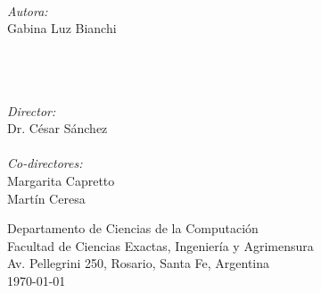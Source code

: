 {\begin{center}
    \HRule \\[0.4cm] %
    \noindent
    \begin{minipage}{0.4\textwidth}
        \begin{flushleft} \large
            \emph{Autora:}\\
            Gabina Luz Bianchi \\\ \\\ \\\ \\
        \end{flushleft}
        \end{minipage}%
        \begin{minipage}{0.4\textwidth}
        \begin{flushright} \large
            \emph{Director:} \\
            Dr. César Sánchez\\
            \ \\
            \emph{Co-directores:} \\
            Margarita Capretto\\
            Martín Ceresa\\
        \end{flushright}
    \end{minipage}

\vfill

Departamento de Ciencias de la Computaci\'on\\
Facultad de Ciencias Exactas, Ingenier\'ia y Agrimensura\\
Av. Pellegrini 250, Rosario, Santa Fe, Argentina\\[0.4cm]
{\large \today}

\end{center}
\clearpage
}